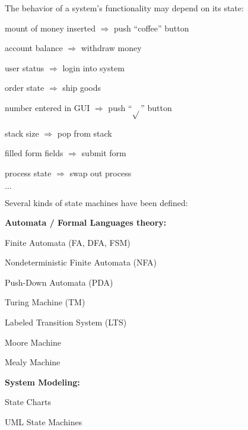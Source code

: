 \begin{itemize*}
\item The behavior of a system's functionality may depend on its state:
\begin{itemize*}
	\item mount of money inserted $\Rightarrow$ push ``coffee'' button
	\item account balance $\Rightarrow$ withdraw money
	\item user status $\Rightarrow$ login into system
	\item order state $\Rightarrow$ ship goods
    \item number entered in GUI $\Rightarrow$ push ``$\sqrt{}$'' button
	\item stack size $\Rightarrow$ pop from stack
	\item filled form fields $\Rightarrow$ submit form
	\item process state $\Rightarrow$ swap out process
	\item $\dots$
\end{itemize*}
\item Several kinds of state machines have been defined:
\begin{itemize*}
	\item \textbf{Automata / Formal Languages theory:}
	\begin{itemize*}
		\item Finite Automata (FA, DFA, FSM)
		\item Nondeterministic Finite Automata (NFA)
		\item Push-Down Automata (PDA)
		\item Turing Machine (TM)
		\item Labeled Transition System (LTS)
		\item Moore Machine
		\item Mealy Machine
	\end{itemize*}
	\item \textbf{System Modeling:}
	\begin{itemize*}
		\item State Charts
		\item UML State Machines
	\end{itemize*}
\end{itemize*}
\end{itemize*}

